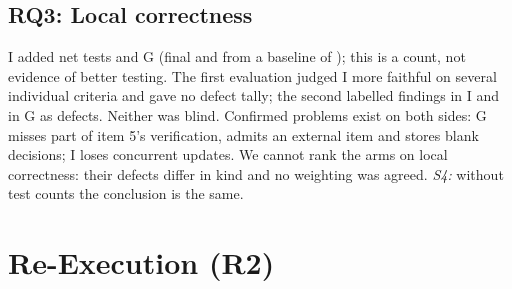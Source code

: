\documentclass[10pt,conference]{IEEEtran}
\newcommand{\G}{G}
\newcommand{\I}{I}
\begin{document}


\subsection{RQ3: Local correctness}\label{sec:a021-rq3}
\I{} added \AtestsAddedIndep{} net tests and \G{} \AtestsAddedGrouped{} (final \AtestsIndep{} and \AtestsGrouped{} from a baseline of \BaselineTests{}); this is a count, not evidence of better testing. %
The first evaluation judged \I{} more faithful on several individual criteria and gave no defect tally; the second labelled \AkitDefectsIndep{} findings in \I{} and \AkitDefectsGrouped{} in \G{} as defects. Neither was blind. %
Confirmed problems exist on both sides: \G{} misses part of item 5's verification, admits an external item and stores blank decisions; \I{} loses concurrent updates. We cannot rank the arms on local correctness: their defects differ in kind and no weighting was agreed. \emph{S4:} without test counts the conclusion is the same. %

\section{Re-Execution (R2)}\label{sec:replication}


\end{document}
